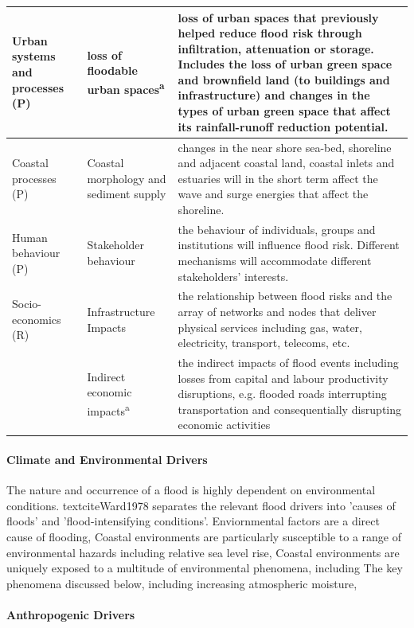 \begin{singlespace}
\begin{longtable}{L{2.5cm} L{3cm} L{8cm}}
\midrule
Urban systems and processes (P) & loss of floodable urban spaces\textsuperscript{a} & loss of urban spaces that previously helped reduce flood risk through infiltration, attenuation or storage. Includes the loss of urban green space and brownfield land (to buildings and infrastructure) and changes in the types of urban green space that affect its rainfall-runoff reduction potential. \\
\midrule
Coastal processes (P) & Coastal morphology and sediment supply & changes in the near shore sea-bed, shoreline and adjacent coastal land, coastal inlets and estuaries will in the short term affect the wave and surge energies that affect the shoreline. \\
\midrule
Human behaviour (P) & Stakeholder behaviour & the behaviour of individuals, groups and institutions will influence flood risk. Different mechanisms will accommodate different stakeholders' interests. \\
\midrule
Socio-economics (R) & Infrastructure Impacts & the relationship between flood risks and the array of networks and nodes that deliver physical services including gas, water, electricity, transport, telecoms, etc. \\
                    & Indirect economic impacts\textsuperscript{a} & the indirect impacts of flood events including losses from capital and labour productivity disruptions, e.g. flooded roads interrupting transportation and consequentially disrupting economic activities \\
\bottomrule
\end{longtable}
\end{singlespace}

\paragraph{Climate and Environmental Drivers}

The nature and occurrence of a flood is highly dependent on environmental
conditions. textcite{Ward1978} separates the relevant flood drivers into 'causes
of floods' and 'flood-intensifying conditions'. Enviornmental factors are a
direct cause of flooding, Coastal environments are particularly susceptible to a
range of environmental hazards including relative sea level rise, Coastal
environments are uniquely exposed to a multitude of environmental phenomena,
including The key phenomena discussed below, including increasing atmospheric
moisture, 

\paragraph{Anthropogenic Drivers}

